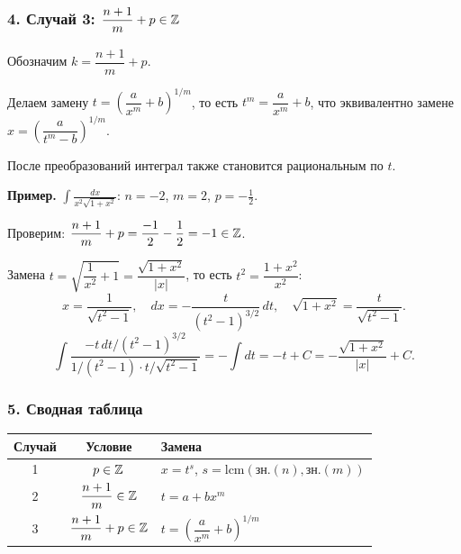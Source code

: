 \subsubsection*{4. Случай 3: $\dfrac{n+1}{m} + p \in \mathbb{Z}$}

Обозначим $k = \dfrac{n+1}{m}+p$.

Делаем замену $t = \left(\dfrac{a}{x^m}+b\right)^{1/m}$, то есть $t^m = \dfrac{a}{x^m}+b$, что эквивалентно замене $x = \left(\dfrac{a}{t^m-b}\right)^{1/m}$.

После преобразований интеграл также становится рациональным по $t$.

\textbf{Пример.} $\displaystyle\int \frac{dx}{x^2\sqrt{1+x^2}}$: $n=-2$, $m=2$, $p=-\tfrac{1}{2}$.

Проверим: $\dfrac{n+1}{m}+p = \dfrac{-1}{2} - \dfrac{1}{2} = -1 \in \mathbb{Z}$.

Замена $t = \sqrt{\dfrac{1}{x^2}+1} = \dfrac{\sqrt{1+x^2}}{|x|}$, то есть $t^2 = \dfrac{1+x^2}{x^2}$:
\[
x = \frac{1}{\sqrt{t^2-1}}, \quad dx = -\frac{t}{(t^2-1)^{3/2}}\,dt, \quad
\sqrt{1+x^2} = \frac{t}{\sqrt{t^2-1}}.
\]
\[
\int \frac{-t\,dt/(t^2-1)^{3/2}}{1/(t^2-1)\cdot t/\sqrt{t^2-1}}
= -\int dt = -t + C = -\frac{\sqrt{1+x^2}}{|x|}+C.
\]

\subsubsection*{5. Сводная таблица}

\begin{center}
\renewcommand{\arraystretch}{1.8}
\begin{tabular}{|c|c|l|}
\hline
\textbf{Случай} & \textbf{Условие} & \textbf{Замена} \\
\hline
1 & $p \in \mathbb{Z}$ & $x = t^s$, $s = \mathrm{lcm}(\text{зн.}(n),\text{зн.}(m))$ \\
2 & $\dfrac{n+1}{m} \in \mathbb{Z}$ & $t = a + bx^m$ \\
3 & $\dfrac{n+1}{m}+p \in \mathbb{Z}$ & $t = \left(\dfrac{a}{x^m}+b\right)^{1/m}$ \\
\hline
\end{tabular}
\end{center}